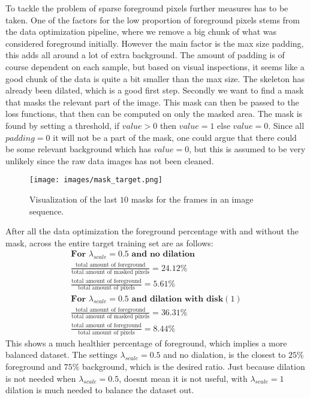 \documentclass[a4paper,12pt]{article}
\begin{document}
To tackle the problem of sparse foreground pixels further measures has to be taken. One of the factors for the low proportion of foreground pixels stems from the data optimization pipeline, where we remove a big chunk of what was considered foreground initially. However the main factor is the max size padding, this adds all around a lot of extra background. The amount of padding is of course dependent on each sample, but based on visual inspections, it seems like a good chunk of the data is quite a bit smaller than the max size. The skeleton has already been dilated, which is a good first step. Secondly we want to find a mask that masks the relevant part of the image. This mask can then be passed to the loss functions, that then can be computed on only the masked area.
The mask is found by setting a threshold, if $value>0$ then $value = 1$ else $value = 0$. Since all $padding = 0$ it will not be a part of the mask, one could argue that there could be some relevant background which has $value = 0$, but this is assumed to be very unlikely since the raw data images has not been cleaned.
\begin{figure}[H]
  \centering
  \texttt{[image: images/mask\_target.png]}
  \caption{Visualization of the last $10$ masks for the frames in an image sequence.} %
  \label{fig:n13}
\end{figure}

After all the data optimization the foreground percentage with and without the mask, across the entire target training set are as follows:
\begin{align*}
  \textbf{For $\lambda_{scale} = 0.5$ and no dilation}\\
  \frac{\text{total amount of foreground}}{\text{total amount of masked pixels}} = 24.12\%\\ 
  \frac{\text{total amount of foreground}}{\text{total amount of pixels}} = 5.61\%\\
  \textbf{For $\lambda_{scale} = 0.5$ and dilation with disk$(1)$}\\
  \frac{\text{total amount of foreground}}{\text{total amount of masked pixels}} = 36.31\%\\ 
  \frac{\text{total amount of foreground}}{\text{total amount of pixels}} = 8.44\%
\end{align*}
This shows a much healthier percentage of foreground, which implies a more balanced dataset. The settings $\lambda_{scale} = 0.5$ and no dialation, is the closest to $25\%$ foreground and $75\%$ background, which is the desired ratio. Just because dilation is not needed when $\lambda_{scale}=0.5$, doesnt mean it is not useful, with $\lambda_{scale}=1$ dilation is much needed to balance the dataset out.
\end{document}
